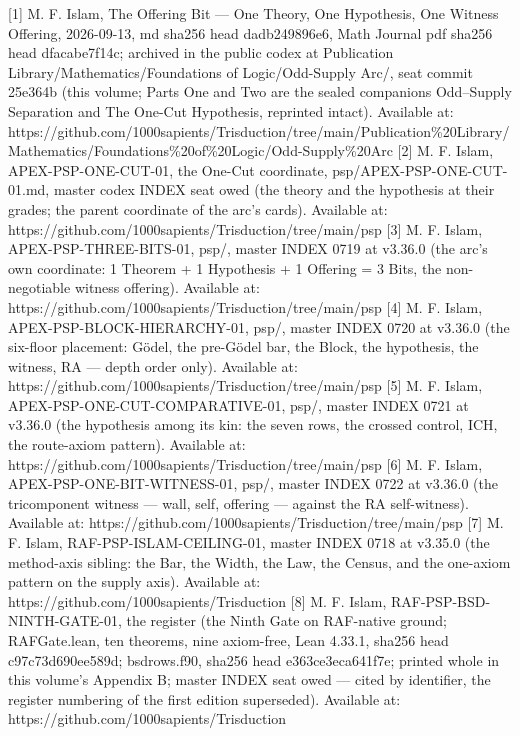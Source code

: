 \documentclass[10pt]{article}
\renewcommand{\_}{\origunderscore\allowbreak}
\begin{document}
{[}1{]} M. F. Islam, The Offering Bit --- One Theory, One Hypothesis,
One Witness Offering, 2026-09-13, md sha256 head dadb249896e6, Math
Journal pdf sha256 head dfacabe7f14c; archived in the public codex at
Publication Library/Mathematics/Foundations of Logic/Odd-Supply Arc/,
seat commit 25e364b (this volume; Parts One and Two are the sealed
companions Odd--Supply Separation and The One-Cut Hypothesis, reprinted
intact). Available at:
https://github.com/1000sapients/Trisduction/tree/main/Publication\%20Library/Mathematics/Foundations\%20of\%20Logic/Odd-Supply\%20Arc
{[}2{]} M. F. Islam, APEX-PSP-ONE-CUT-01, the One-Cut coordinate,
psp/APEX-PSP-ONE-CUT-01.md, master codex INDEX seat owed (the theory and
the hypothesis at their grades; the parent coordinate of the arc's
cards). Available at:
https://github.com/1000sapients/Trisduction/tree/main/psp {[}3{]} M. F.
Islam, APEX-PSP-THREE-BITS-01, psp/, master INDEX 0719 at v3.36.0 (the
arc's own coordinate: 1 Theorem + 1 Hypothesis + 1 Offering = 3 Bits,
the non-negotiable witness offering). Available at:
https://github.com/1000sapients/Trisduction/tree/main/psp {[}4{]} M. F.
Islam, APEX-PSP-BLOCK-HIERARCHY-01, psp/, master INDEX 0720 at v3.36.0
(the six-floor placement: Gödel, the pre-Gödel bar, the Block, the
hypothesis, the witness, RA --- depth order only). Available at:
https://github.com/1000sapients/Trisduction/tree/main/psp {[}5{]} M. F.
Islam, APEX-PSP-ONE-CUT-COMPARATIVE-01, psp/, master INDEX 0721 at
v3.36.0 (the hypothesis among its kin: the seven rows, the crossed
control, ICH, the route-axiom pattern). Available at:
https://github.com/1000sapients/Trisduction/tree/main/psp {[}6{]} M. F.
Islam, APEX-PSP-ONE-BIT-WITNESS-01, psp/, master INDEX 0722 at v3.36.0
(the tricomponent witness --- wall, self, offering --- against the RA
self-witness). Available at:
https://github.com/1000sapients/Trisduction/tree/main/psp {[}7{]} M. F.
Islam, RAF-PSP-ISLAM-CEILING-01, master INDEX 0718 at v3.35.0 (the
method-axis sibling: the Bar, the Width, the Law, the Census, and the
one-axiom pattern on the supply axis). Available at:
https://github.com/1000sapients/Trisduction {[}8{]} M. F. Islam,
RAF-PSP-BSD-NINTH-GATE-01, the register (the Ninth Gate on RAF-native
ground; RAFGate.lean, ten theorems, nine axiom-free, Lean 4.33.1, sha256
head c97c73d690ee589d; bsd\_rows.f90, sha256 head e363ce3eca641f7e;
printed whole in this volume's Appendix B; master INDEX seat owed ---
cited by identifier, the register numbering of the first edition
superseded). Available at: https://github.com/1000sapients/Trisduction
\end{document}
